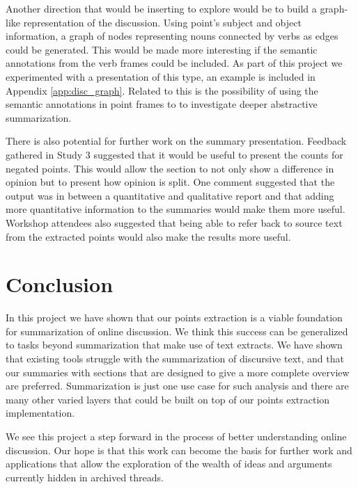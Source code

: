     Another direction that would be inserting to explore would be to build a graph-like representation of the discussion. Using point's subject and object information, a graph of nodes representing nouns connected by verbs as edges could be generated. This would be made more interesting if the semantic annotations from the verb frames could be included. As part of this project we experimented with a presentation of this type, an example is included in Appendix \ref{app:disc_graph}. Related to this is the possibility of using the semantic annotations in point frames to to investigate deeper abstractive summarization.

    There is also potential for further work on the summary presentation. Feedback gathered in Study 3 suggested that it would be useful to present the counts for negated points. This would allow the section to not only show a difference in opinion but to present how opinion is split. One comment suggested that the output was in between a quantitative and qualitative report and that adding more quantitative information to the summaries would make them more useful. Workshop attendees also suggested that being able to refer back to source text from the extracted points would also make the results more useful.

  \section{Conclusion}
    In this project we have shown that our points extraction is a viable foundation for summarization of online discussion. We think this success can be generalized to tasks beyond summarization that make use of text extracts. We have shown that existing tools struggle with the summarization of discursive text, and that our summaries with sections that are designed to give a more complete overview are preferred. Summarization is just one use case for such analysis and there are many other varied layers that could be built on top of our points extraction implementation.

    We see this project a step forward in the process of better understanding online discussion. Our hope is that this work can become the basis for further work and applications that allow the exploration of the wealth of ideas and arguments currently hidden in archived threads.
